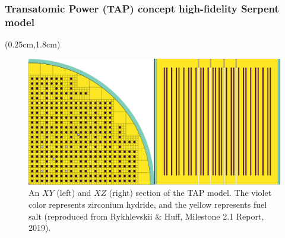 \begin{frame}
\frametitle{Transatomic Power (TAP) concept high-fidelity Serpent model}
	  \begin{textblock*}{12.25cm}(0.25cm,1.8cm) %
\begin{figure}[htp!] %
	\includegraphics[width=\textwidth]{./images/tap_model.png}
	\caption{An $XY$ (left) and $XZ$ (right) section of the TAP model. 
	The violet color represents zirconium hydride, and the yellow represents 
	fuel salt (reproduced from Rykhlevskii \& Huff, Milestone 2.1 Report, 
	2019).}
\end{figure}
	  \end{textblock*}
\end{frame}


